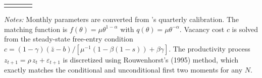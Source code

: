 \begin{table}[ht]
\begin{tabular}{llll}
\addlinespace
\bottomrule
\end{tabular}
\parbox{\linewidth}{\smallskip\footnotesize
\textit{Notes:} Monthly parameters are converted from \citet{shimer2005}'s quarterly
calibration. The matching function is $f(\theta)=\mu\theta^{1-\alpha}$ with
$q(\theta)=\mu\theta^{-\alpha}$. Vacancy cost $c$ is solved from the
steady-state free-entry condition
$c = (1-\gamma)(\bar{z}-b)\big/\!\left[\mu^{-1}(1-\beta(1-s))
+\beta\gamma\right]$.
The productivity process $z_{t+1} = \rho\, z_t + \varepsilon_{t+1}$ is
discretized using Rouwenhorst's (1995) method, which exactly matches
the conditional and unconditional first two moments for any $N$.}
\end{table}
